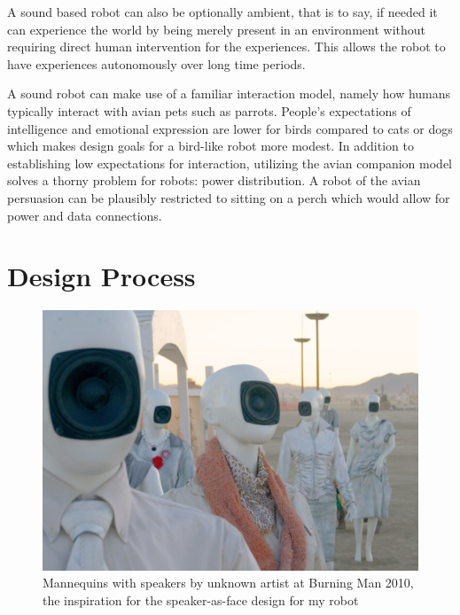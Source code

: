 A sound based robot can also be optionally ambient, that is to say, if needed it can experience the world by being merely present in an environment without requiring direct human intervention for the experiences. This allows the robot to have experiences autonomously over long time periods. 

A sound robot can make use of a familiar interaction model, namely how humans typically interact with avian pets such as parrots. People's expectations of intelligence and emotional expression are lower for birds compared to cats or dogs which makes design goals for a bird-like robot more modest. In addition to establishing low expectations for interaction, utilizing the avian companion model solves a thorny problem for robots: power distribution. A robot of the avian persuasion can be plausibly restricted to sitting on a perch which would allow for power and data connections. 


\section{Design Process}

   \begin{figure}[thpb]
      \centering
      \includegraphics[width=4.6in]{figures/design/burning_man_speakers_sm.jpg}
      \caption{Mannequins with speakers by unknown artist at Burning Man 2010, the inspiration for the speaker-as-face design for my robot}
      \label{fig_burning_man_speakers_sm}
   \end{figure}
   



